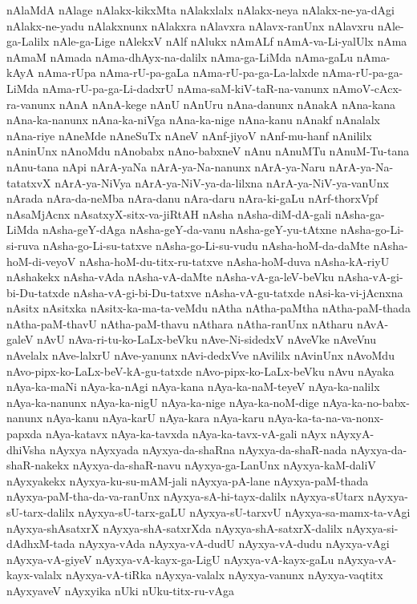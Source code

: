 {nAlaMdA
nAlage
nAlakx-kikxMta
nAlakxlalx
nAlakx-neya
nAlakx-ne-ya-dAgi
nAlakx-ne-yadu
nAlakxnunx
nAlakxra
nAlavxra
nAlavx-ranUnx
nAlavxru
nAle-ga-Lalilx
nAle-ga-Lige
nAlekxV
nAlf
nAlukx
nAmALf
nAmA-va-Li-yalUlx
nAma
nAmaM
nAmada
nAma-dhAyx-na-dalilx
nAma-ga-LiMda
nAma-gaLu
nAma-kAyA
nAma-rUpa
nAma-rU-pa-gaLa
nAma-rU-pa-ga-La-lalxde
nAma-rU-pa-ga-LiMda
nAma-rU-pa-ga-Li-dadxrU
nAma-saM-kiV-taR-na-vanunx
nAmoV-cAcx-ra-vanunx
nAnA
nAnA-kege
nAnU
nAnUru
nAna-danunx
nAnakA
nAna-kana
nAna-ka-nanunx
nAna-ka-niVga
nAna-ka-nige
nAna-kanu
nAnakf
nAnalalx
nAna-riye
nAneMde
nAneSuTx
nAneV
nAnf-jiyoV
nAnf-mu-hanf
nAnililx
nAninUnx
nAnoMdu
nAnobabx
nAno-babxneV
nAnu
nAnuMTu
nAnuM-Tu-tana
nAnu-tana
nApi
nArA-yaNa
nArA-ya-Na-nanunx
nArA-ya-Naru
nArA-ya-Na-tatatxvX
nArA-ya-NiVya
nArA-ya-NiV-ya-da-lilxna
nArA-ya-NiV-ya-vanUnx
nArada
nAra-da-neMba
nAra-danu
nAra-daru
nAra-ki-gaLu
nArf-thorxVpf
nAsaMjAcnx
nAsatxyX-sitx-va-jiRtAH
nAsha
nAsha-diM-dA-gali
nAsha-ga-LiMda
nAsha-geY-dAga
nAsha-geY-da-vanu
nAsha-geY-yu-tAtxne
nAsha-go-Li-si-ruva
nAsha-go-Li-su-tatxve
nAsha-go-Li-su-vudu
nAsha-hoM-da-daMte
nAsha-hoM-di-veyoV
nAsha-hoM-du-titx-ru-tatxve
nAsha-hoM-duva
nAsha-kA-riyU
nAshakekx
nAsha-vAda
nAsha-vA-daMte
nAsha-vA-ga-leV-beVku
nAsha-vA-gi-bi-Du-tatxde
nAsha-vA-gi-bi-Du-tatxve
nAsha-vA-gu-tatxde
nAsi-ka-vi-jAcnxna
nAsitx
nAsitxka
nAsitx-ka-ma-ta-veMdu
nAtha
nAtha-paMtha
nAtha-paM-thada
nAtha-paM-thavU
nAtha-paM-thavu
nAthara
nAtha-ranUnx
nAtharu
nAvA-galeV
nAvU
nAva-ri-tu-ko-LaLx-beVku
nAve-Ni-sidedxV
nAveVke
nAveVnu
nAvelalx
nAve-lalxrU
nAve-yanunx
nAvi-dedxVve
nAvililx
nAvinUnx
nAvoMdu
nAvo-pipx-ko-LaLx-beV-kA-gu-tatxde
nAvo-pipx-ko-LaLx-beVku
nAvu
nAyaka
nAya-ka-maNi
nAya-ka-nAgi
nAya-kana
nAya-ka-naM-teyeV
nAya-ka-nalilx
nAya-ka-nanunx
nAya-ka-nigU
nAya-ka-nige
nAya-ka-noM-dige
nAya-ka-no-babx-nanunx
nAya-kanu
nAya-karU
nAya-kara
nAya-karu
nAya-ka-ta-na-va-nonx-papxda
nAya-katavx
nAya-ka-tavxda
nAya-ka-tavx-vA-gali
nAyx
nAyxyA-dhiVsha
nAyxya
nAyxyada
nAyxya-da-shaRna
nAyxya-da-shaR-nada
nAyxya-da-shaR-nakekx
nAyxya-da-shaR-navu
nAyxya-ga-LanUnx
nAyxya-kaM-daliV
nAyxyakekx
nAyxya-ku-su-mAM-jali
nAyxya-pA-lane
nAyxya-paM-thada
nAyxya-paM-tha-da-va-ranUnx
nAyxya-sA-hi-tayx-dalilx
nAyxya-sUtarx
nAyxya-sU-tarx-dalilx
nAyxya-sU-tarx-gaLU
nAyxya-sU-tarxvU
nAyxya-sa-mamx-ta-vAgi
nAyxya-shAsatxrX
nAyxya-shA-satxrXda
nAyxya-shA-satxrX-dalilx
nAyxya-si-dAdhxM-tada
nAyxya-vAda
nAyxya-vA-dudU
nAyxya-vA-dudu
nAyxya-vAgi
nAyxya-vA-giyeV
nAyxya-vA-kayx-ga-LigU
nAyxya-vA-kayx-gaLu
nAyxya-vA-kayx-valalx
nAyxya-vA-tiRka
nAyxya-valalx
nAyxya-vanunx
nAyxya-vaqtitx
nAyxyaveV
nAyxyika
nUki
nUku-titx-ru-vAga
}
